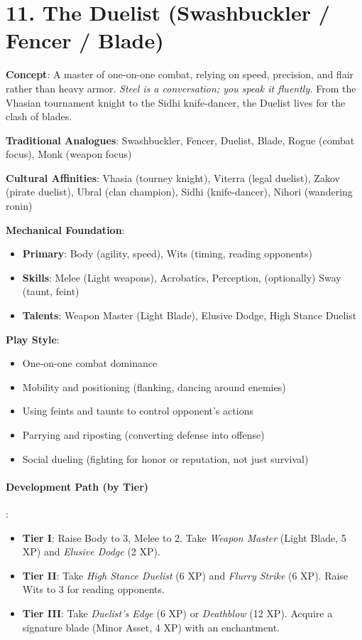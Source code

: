 \section{11. The Duelist (Swashbuckler / Fencer / Blade)}
\label{sec:concept-duelist}

\textbf{Concept}: A master of one-on-one combat, relying on speed, precision, and flair rather than heavy armor. \emph{Steel is a conversation; you speak it fluently.} From the Vhasian tournament knight to the Sidhi knife-dancer, the Duelist lives for the clash of blades.

\textbf{Traditional Analogues}: Swashbuckler, Fencer, Duelist, Blade, Rogue (combat focus), Monk (weapon focus)

\textbf{Cultural Affinities}: Vhasia (tourney knight), Viterra (legal duelist), Zakov (pirate duelist), Ubral (clan champion), Sidhi (knife-dancer), Nihori (wandering ronin)

\textbf{Mechanical Foundation}:
\begin{itemize}
\item \textbf{Primary}: Body (agility, speed), Wits (timing, reading opponents)
\item \textbf{Skills}: Melee (Light weapons), Acrobatics, Perception, (optionally) Sway (taunt, feint)
\item \textbf{Talents}: Weapon Master (Light Blade), Elusive Dodge, High Stance Duelist
\end{itemize}

\textbf{Play Style}:
\begin{itemize}
\item One-on-one combat dominance
\item Mobility and positioning (flanking, dancing around enemies)
\item Using feints and taunts to control opponent's actions
\item Parrying and riposting (converting defense into offense)
\item Social dueling (fighting for honor or reputation, not just survival)
\end{itemize}

\paragraph{Development Path (by Tier)}:
\begin{itemize}
\item \textbf{Tier I}: Raise Body to 3, Melee to 2. Take \emph{Weapon Master} (Light Blade, 5 XP) and \emph{Elusive Dodge} (2 XP).
\item \textbf{Tier II}: Take \emph{High Stance Duelist} (6 XP) and \emph{Flurry Strike} (6 XP). Raise Wits to 3 for reading opponents.
\item \textbf{Tier III}: Take \emph{Duelist's Edge} (6 XP) or \emph{Deathblow} (12 XP). Acquire a signature blade (Minor Asset, 4 XP) with an enchantment.
\end{itemize}

